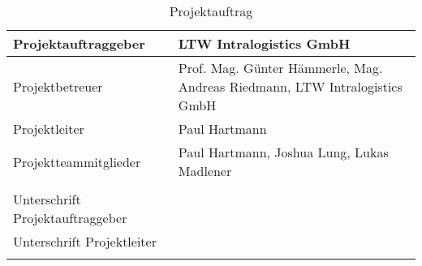 \begin{longtable}{p{}|p{}}
  Projektauftraggeber   & LTW Intralogistics GmbH                                                                        \\ \midrule

  Projektbetreuer       & Prof. Mag. Günter Hämmerle, Mag. Andreas Riedmann, LTW Intralogistics GmbH                     \\ \midrule

  Projektleiter         & Paul Hartmann                                                                                  \\ \midrule

  Projektteammitglieder & Paul Hartmann, Joshua Lung, Lukas Madlener                                                     \\ \midrule

  \\
  Unterschrift Projektauftraggeber                                                                                       \\ \midrule
  Unterschrift Projektleiter                                                                                             \\
  \bottomrule
  \caption{Projektauftrag}
  \label{tab:projektauftrag}
\end{longtable}
